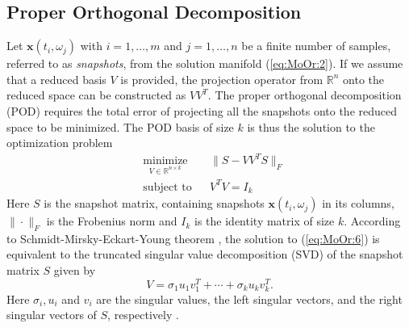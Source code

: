 \subsection{Proper Orthogonal Decomposition} \label{chap:MoOr.PrOr:1}
Let $\mathbf x (t_i,\omega_j)$ with $i=1,\dots,m$ and $j=1,\dots,n$ be a finite number of samples, referred to as \emph{snapshots}, from the solution manifold (\ref{eq:MoOr:2}). If we {\edit assume} that a reduced basis $V$ is provided, the projection operator from $\mathbb R^n$ onto the reduced space can be constructed as $VV^T$. The proper orthogonal decomposition (POD) requires the total error of projecting all the snapshots onto the reduced space to be {\edit minimized}. The POD basis of size $k$ is thus the solution to the optimization problem
\begin{equation} \label{eq:MoOr:6}
\begin{aligned}
& \underset{V\in \mathbb R^{n\times k}}{\text{minimize}}
& & \| S - VV^TS\|_F \\
& \text{subject to}
& & V^TV = I_k
\end{aligned}
\end{equation}
Here $S$ is the snapshot matrix, containing snapshots $\mathbf x(t_i,\omega_j)$ in its columns, $\|\cdot \|_F$ is the Frobenius norm and $I_k$ is the identity matrix of size $k$. According to {\edit Schmidt-Mirsky-Eckart-Young theorem \cite{Markovsky:2011:LRA:2103589}}, the solution to (\ref{eq:MoOr:6}) is equivalent to the truncated singular value decomposition (SVD) of the snapshot matrix $S$ given by
\begin{equation} \label{eq:MoOr:7}
	V = \sigma_1 u_1 v^T_1 + \cdots + \sigma_k u_k v^T_k.
\end{equation}
Here $\sigma_i, u_i$ and $v_i$ are the singular values, the left singular vectors, and the right singular vectors of $S$, respectively {\edit \cite{Markovsky:2011:LRA:2103589} }.


